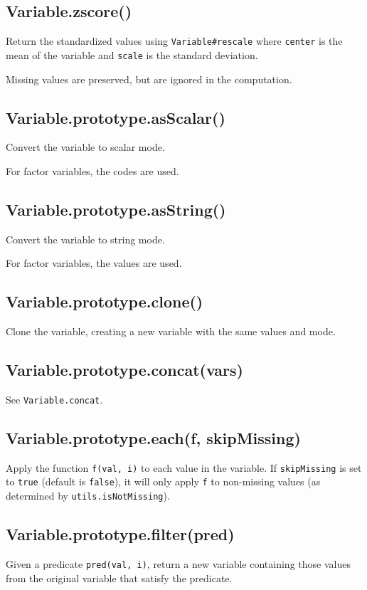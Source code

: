 \documentclass{article}
\begin{document}
    \subsection{Variable.zscore()}
    Return the standardized values using \texttt{Variable\#rescale} where \texttt{center} is the
mean of the variable and \texttt{scale} is the standard deviation.


Missing values are preserved, but are ignored in the computation.


    \subsection{Variable.prototype.asScalar()}
    Convert the variable to scalar mode.


For factor variables, the codes are used.


    \subsection{Variable.prototype.asString()}
    Convert the variable to string mode.


For factor variables, the values are used.


    \subsection{Variable.prototype.clone()}
    Clone the variable, creating a new variable with the same values and mode.


    \subsection{Variable.prototype.concat(vars)}
    See \texttt{Variable.concat}.


    \subsection{Variable.prototype.each(f, skipMissing)}
    Apply the function \texttt{f(val, i)} to each value in the variable.
If \texttt{skipMissing} is set to \texttt{true} (default is \texttt{false}), it will only apply
\texttt{f} to non-missing values (as determined by \texttt{utils.isNotMissing}).


    \subsection{Variable.prototype.filter(pred)}
    Given a predicate \texttt{pred(val, i)}, return a new variable containing
those values from the original variable that satisfy the predicate.
\end{document}
